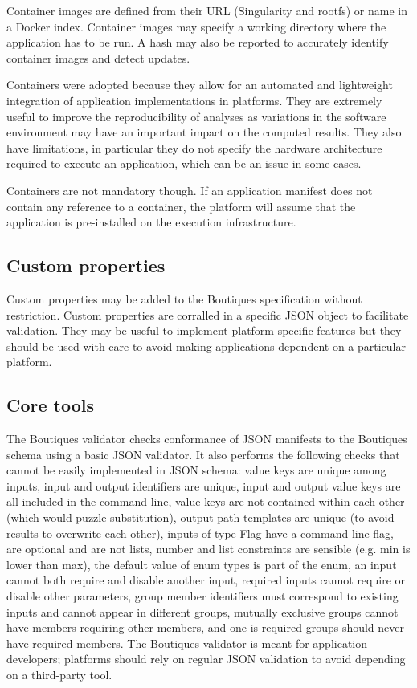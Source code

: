 \documentclass{article}
\begin{document}
Container images are defined from their URL (Singularity and rootfs)
or name in a Docker index. Container images may specify a working
directory where the application has to be run. A hash may also be
reported to accurately identify container images and detect updates.

Containers were adopted because they allow for an automated and
lightweight integration of application implementations in
platforms. They are extremely useful to improve the reproducibility of
analyses as variations in the software environment may have an
important impact on the computed results. They also have limitations,
in particular they do not specify the hardware architecture required
to execute an application, which can be an issue in some cases.

Containers are not mandatory though. If an application manifest does
not contain any reference to a container, the platform will assume
that the application is pre-installed on the execution infrastructure. 

\subsection{Custom properties}

Custom properties may be added to the Boutiques specification without
restriction. Custom properties are corralled in a specific JSON object
to facilitate validation. They may be useful to implement
platform-specific features but they should be used with care to avoid
making applications dependent on a particular platform.

\subsection{Core tools} 

The Boutiques validator checks conformance of JSON manifests to the
Boutiques schema using a basic JSON validator. It also performs the
following checks that cannot be easily implemented in JSON schema:
value keys are unique among inputs, input and output identifiers are
unique, input and output value keys are all included in the command
line, value keys are not contained within each other (which would
puzzle substitution), output path templates are unique (to avoid
results to overwrite each other), inputs of type Flag have a
command-line flag, are optional and are not lists, number and list
constraints are sensible (e.g. min is lower than max), the default
value of enum types is part of the enum, an input cannot both require
and disable another input, required inputs cannot require or disable
other parameters, group member identifiers must correspond to existing
inputs and cannot appear in different groups, mutually exclusive
groups cannot have members requiring other members, and
one-is-required groups should never have required members. The
Boutiques validator is meant for application developers; platforms
should rely on regular JSON validation to avoid depending on a
third-party tool.
\end{document}
